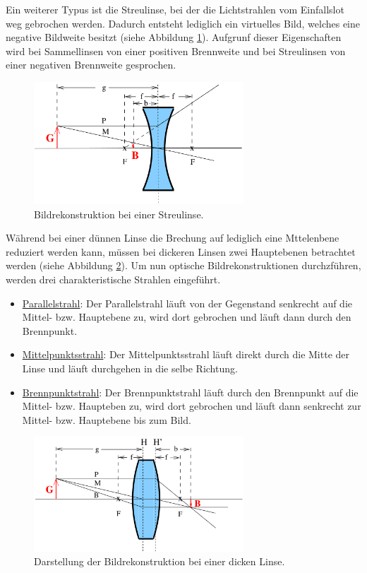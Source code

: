 Ein weiterer Typus ist die Streulinse, bei der die Lichtstrahlen vom Einfallslot
weg gebrochen werden. Dadurch entsteht lediglich ein virtuelles Bild, welches
eine negative Bildweite besitzt (siehe Abbildung \ref{fig:Streulinse}). Aufgrunf dieser
Eigenschaften wird bei Sammellinsen von einer positiven Brennweite und bei
Streulinsen von einer negativen Brennweite gesprochen.

\begin{figure}
  \centering
  \includegraphics[width = 0.7\textwidth]{Streulinse.png}
  \caption{Bildrekonstruktion bei einer Streulinse. \cite{anleitung01}}
  \label{fig:Streulinse}
\end{figure}

Während bei einer dünnen Linse die Brechung auf lediglich eine Mttelenbene reduziert
werden kann, müssen bei dickeren Linsen zwei Hauptebenen betrachtet werden (siehe
Abbildung \ref{fig:dickeLinse}). Um nun optische Bildrekonstruktionen durchzführen, werden
drei charakteristische Strahlen eingeführt.

\begin{itemize}
  \item \underline{Parallelstrahl}: Der Parallelstrahl läuft von der Gegenstand
  senkrecht auf die Mittel- bzw. Hauptebene zu, wird dort gebrochen und läuft
  dann durch den Brennpunkt.
  \item \underline{Mittelpunktsstrahl}: Der Mittelpunktsstrahl läuft direkt durch
  die Mitte der Linse und läuft durchgehen in die selbe Richtung.
  \item \underline{Brennpunktstrahl}: Der Brennpunktstrahl läuft durch den Brennpunkt
  auf die Mittel- bzw.  Haupteben zu, wird dort gebrochen und läuft dann senkrecht
  zur Mittel- bzw. Hauptebene bis zum Bild.
\end{itemize}

\begin{figure}
  \centering
  \includegraphics[width = 0.7\textwidth]{dickeLinse.png}
  \caption{Darstellung der Bildrekonstruktion bei einer dicken Linse.\cite{anleitung01}}
  \label{fig:dickeLinse}
\end{figure}

